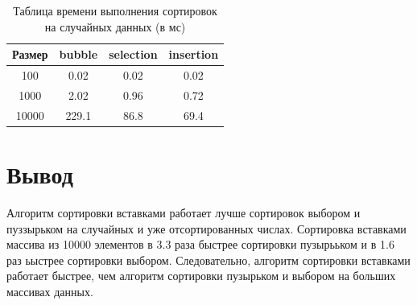 \documentclass[a4paper,12pt]{report}
\begin{document}
	\begin{table} [h!]
		\caption{Таблица времени выполнения сортировок на случайных данных (в мс)}
		\begin{center}
			\begin{tabular}{|c | c | c | c|}
				
				\hline
				
				Размер & bubble & selection & insertion  \\ [0.5ex]
				
				\hline
				
				100 & 0.02 & 0.02 & 0.02 \\ 
				
				\hline 
				
				1000 & 2.02 & 0.96 & 0.72 \\ 
				
				\hline 
				
				10000 & 229.1 & 86.8 & 69.4 \\ 
				
				\hline 
				
			\end{tabular}
		\end{center}
	\end{table}

	\begin{center}
	\end{center}

	\section{Вывод}
	
	Алгоритм сортировки вставками работает лучше сортировок выбором и пуззырьком на случайных и уже отсортированных числах. Сортировка вставками массива из 10000 элементов в 3.3 раза быстрее сортировки пузырььком и в 1.6 раз ьыстрее сортировки выбором. Следовательно, алгоритм сортировки вставками работает быстрее, чем алгоритм сортировки пузырьком и выбором на больших массивах данных.
	
\end{document}
